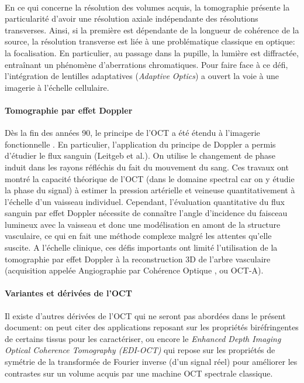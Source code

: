 \\
En ce qui  concerne la résolution des volumes acquis, la tomographie présente la particularité d'avoir une résolution axiale indépendante des résolutions transverses.  Ainsi, si la première est dépendante de la longueur de cohérence de la source, la résolution transverse est liée à une problématique classique en optique: la focalisation. En particulier, au passage dans la pupille, la lumière est diffractée, entraînant un phénomène d'aberrations chromatiques. Pour faire face à ce défi, l'intégration de lentilles adaptatives (\textit{Adaptive Optics}) a ouvert la voie à une imagerie à l'échelle cellulaire. 
\paragraph{Tomographie par effet Doppler}
Dès la fin des années 90, le principe de l'OCT a été étendu à l'imagerie fonctionnelle \cite{wangCharacterizationFluidFlow1995}. En particulier, l'application du principe de Doppler a permis d'étudier le flux sanguin (Leitgeb et al.\cite{leitgebRealtimeMeasurementVitro2004, leitgebDopplerOpticalCoherence2014}). On utilise le changement de phase induit dans les rayons réfléchis du fait du mouvement du sang. Ces travaux ont montré la capacité théorique de l'OCT (dans le domaine spectral car on y étudie la phase du signal) à estimer la pression artérielle et veineuse quantitativement à l'échelle d'un vaisseau individuel. Cependant, l'évaluation quantitative du flux sanguin par effet Doppler nécessite de connaître l'angle d'incidence du faisceau lumineux avec la vaisseau et donc une modélisation en amont de la structure vasculaire, ce qui en fait une méthode complexe malgré les attentes qu'elle suscite.
A l'échelle clinique, ces défis importants ont limité l'utilisation de la tomographie par effet Doppler à la reconstruction 3D de l'arbre vasculaire (acquisition appelée \og Angiographie par Cohérence Optique \fg, ou OCT-A). 

\paragraph{Variantes et dérivées de l'\ac{OCT}}
Il existe d'autres dérivées de l'\ac{OCT} qui ne seront pas abordées dans le présent document: on peut citer des applications reposant sur les propriétés biréfringentes de certains tissus pour les caractériser, ou encore le \textit{Enhanced Depth Imaging Optical Coherence Tomography (EDI-OCT)} qui repose sur les propriétés de symétrie de la transformée de Fourier inverse (d'un signal réel) pour améliorer les contrastes sur un volume acquis par une machine \ac{OCT} spectrale classique.

